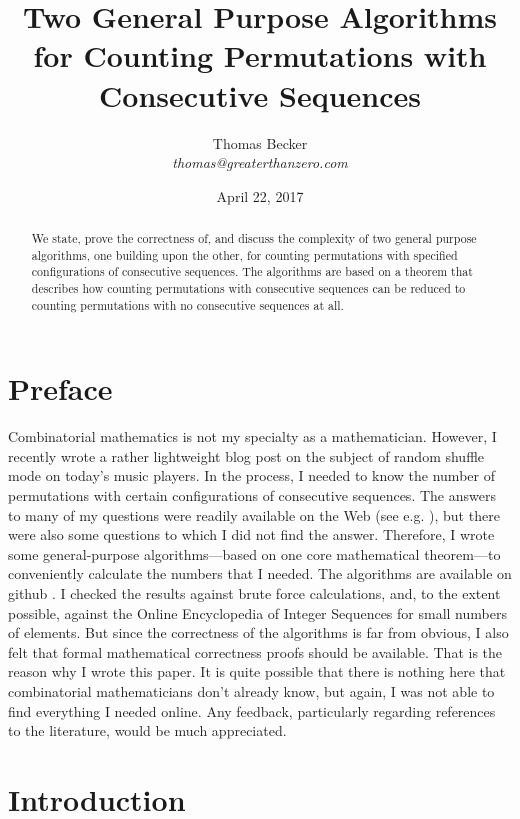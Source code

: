 \documentclass{article}
\begin{document}
\author{Thomas Becker\\ {\small \it thomas@greaterthanzero.com}}
\title{Two General Purpose Algorithms for Counting Permutations with Consecutive Sequences}
\date{\small April 22, 2017}
\maketitle

\begin{abstract}
  We state, prove the correctness of, and discuss the complexity of two general
  purpose algorithms, one building upon the other, for counting permutations with
  specified configurations of consecutive sequences. The algorithms are based on
  a theorem that describes how counting permutations with consecutive sequences can
  be reduced to counting permutations with no consecutive sequences at all.
\end{abstract}

\section{Preface}
Combinatorial mathematics is not my specialty as a mathematician. However, I recently wrote
a rather lightweight blog post \cite{BlogPost} on the subject of random shuffle mode on today's
music players. In the process, I needed to know the number of permutations with certain
configurations of consecutive sequences. The answers to many of my questions were readily
available on the Web (see e.g. \cite{Oeis}),
but there were also some questions to which I did not find the answer. Therefore, I
wrote some general-purpose algorithms---based on one core mathematical theorem---to conveniently
calculate the numbers that I needed. The algorithms are available on github \cite{Algos}.
I checked the results against brute force calculations, and, to the extent possible, against
the Online Encyclopedia of Integer Sequences \cite{Oeis} for small numbers of elements.
But since the correctness of the algorithms
is far from obvious, I also felt that formal mathematical correctness proofs should be available.
That is the reason why I wrote this paper. It is quite possible that there is nothing here that
combinatorial mathematicians don't already know, but again, I was not able to find everything I
needed online. Any feedback, particularly regarding references to
the literature, would be much appreciated.

\section{Introduction}
\end{document}
